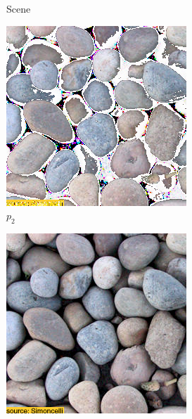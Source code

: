 \begin{figure}[ht]
\begin{subfigure}{\textwidth}
\begin{subfigure}{0.2\textwidth}
            \caption*{Scene}
            \label{fig:intro_pixels_vs_stats-stats_bg}
        \end{subfigure}
        \hfill
        \begin{subfigure}{0.2\textwidth}
            \centering
            \includegraphics[width=\textwidth]{images/01-pixels_vs_stats-stats_opt.jpg}
            \caption*{\(p_2\)}
            \label{fig:intro_pixels_vs_stats-stats_opt}
        \end{subfigure}
        \hfill
        \begin{subfigure}{0.2\textwidth}
            \centering
            \includegraphics[width=\textwidth]{images/01-pixels_vs_stats-stats_proj.jpg}

\end{subfigure}
\end{subfigure}
\end{figure}
